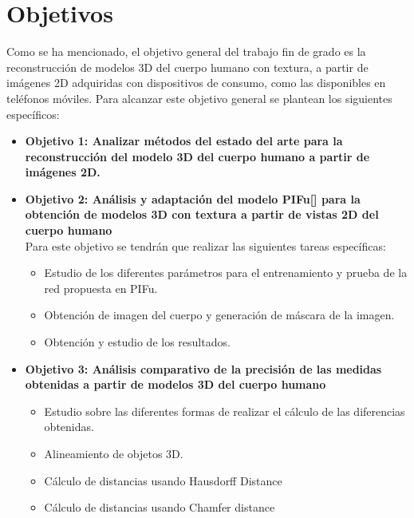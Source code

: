 \newpage
\section{Objetivos}





Como se ha mencionado, el objetivo general del trabajo fin de grado es la reconstrucción de modelos 3D del cuerpo humano con textura, a partir de imágenes 2D adquiridas con dispositivos de consumo, como las disponibles en teléfonos móviles. Para alcanzar este objetivo general se plantean los siguientes específicos:


\begin{itemize}
	\item{\textbf{Objetivo 1: Analizar métodos del estado del arte para la reconstrucción del modelo 3D del cuerpo humano a partir de imágenes 2D.}} 
	
	\item{\textbf{Objetivo 2: Análisis y adaptación del modelo PIFu[\cite{pifu}] para la obtención de modelos 3D con textura a partir de vistas 2D del cuerpo humano  }} \\
	Para este objetivo se tendrán que realizar las siguientes tareas específicas:
	\begin{itemize}
		\item Estudio de los diferentes parámetros para el entrenamiento y prueba de la red propuesta en PIFu.
		\item Obtención de imagen del cuerpo y generación de máscara de la imagen.
		\item Obtención y estudio de los resultados.
		
	\end{itemize}
	
	\item{\textbf{Objetivo 3: Análisis comparativo de la precisión de las medidas obtenidas a partir de modelos 3D del cuerpo humano }} \\
	\begin{itemize}
		\item Estudio sobre las diferentes formas de realizar el cálculo de las diferencias obtenidas.
		\item Alineamiento de objetos 3D.
		\item Cálculo de distancias usando Hausdorff Distance
		\item Cálculo de distancias usando Chamfer distance
	\end{itemize}
\end{itemize}
\clearpage


